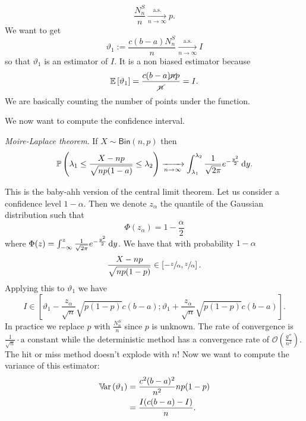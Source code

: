 \documentclass[12pt]{report}
\begin{document}
\begin{equation*}
	\frac{N_{n}^{S}}{n}\xrightarrow[n\to\infty]{\mathrm{a.s.}}p.
\end{equation*}
We want to get
\begin{equation*}
	\vartheta_{1}:=\frac{c(b-a)N^{S}_{n}}{n}\xrightarrow[n\to\infty]{\mathrm{a.s.}}I
\end{equation*}
so that $\vartheta_{1}$ is an estimator of $I$. It is a non biased estimator because
\begin{equation*}
	\mathbb{E}\left[\vartheta_{1}\right]=\frac{c(b-a)\cancel{n}p}{\cancel{n}}=I.
\end{equation*}
We are basically counting the number of points under the function. \par
We now want to compute the confidence interval.
\begin{theorem}
	\emph{Moire-Laplace theorem}. If $X\sim\mathsf{Bin}(n,p)$ then
	\begin{equation*}
		\mathbb{P}\left(\lambda_1\leq\frac{X-np}{\sqrt{np(1-a)}}\leq\lambda_2\right)\xrightarrow[n\to\infty]{}\int_{\lambda_1}^{\lambda_2}\frac{1}{\sqrt{2\pi}}e^{-\frac{y^{2}}{2}}\mathop{}\!\mathrm{d} y.
	\end{equation*}
\end{theorem}
This is the baby-ahh version of the central limit theorem. Let us consider a confidence level $1-\alpha$. Then we denote $z_\alpha$ the quantile of the Gaussian distribution such that
\begin{equation*}
	\Phi(z_\alpha)=1-\frac{\alpha}{2}
\end{equation*}
where $\Phi(z)=\int_{-\infty}^{z}\frac{1}{\sqrt{2\pi}}e^{-\frac{y^{2}}{2}}\mathop{}\!\mathrm{d} y$. We have that with probability $1-\alpha$
\begin{equation*}
	\frac{X-np}{\sqrt{np(1-p)}}\in\left[-\sfrac{z}{\alpha},\sfrac{z}{\alpha}\right].
\end{equation*}
Applying this to $\vartheta_{1}$ we have
\begin{equation*}
	I\in\left[\vartheta_1-\frac{z_\alpha}{\sqrt{n}}\sqrt{p(1-p)}c(b-a);\vartheta_1+\frac{z_\alpha}{\sqrt{n}}\sqrt{p(1-p)}c(b-a)\right].
\end{equation*}
In practice we replace $p$ with $\frac{N^{S}_{n}}{n}$ since $p$ is unknown. The rate of convergence is $\frac{1}{\sqrt{n}}\cdot \text{a constant}$ while the deterministic method has a convergence rate of $\mathcal{O}\left(\frac{g''}{n^{2}}\right)$. The hit or miss method doesn't explode with $n$! Now we want to compute the variance of this estimator:
\begin{align*}
	\mathbb{V}\!\mathrm{ar}\,(\vartheta_1)&=\frac{c^{2}(b-a)^{2}}{n^{2}}np(1-p)\\
	&=\frac{I(c(b-a)-I)}{n}.
\end{align*}
\end{document}
